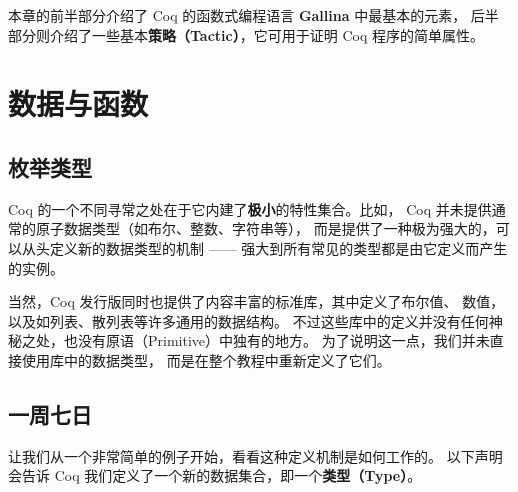 \documentclass[utf8]{ctexart}
\begin{document}
本章的前半部分介绍了 Coq 的函数式编程语言 \textbf{Gallina}
中最基本的元素，
后半部分则介绍了一些基本\textbf{策略（Tactic）}，它可用于证明 Coq
程序的简单属性。

\protect\hypertarget{lab19}{}{}

\hypertarget{ux6570ux636eux4e0eux51fdux6570}{%
\section{数据与函数}\label{ux6570ux636eux4e0eux51fdux6570}}

\protect\hypertarget{lab20}{}{}

\hypertarget{ux679aux4e3eux7c7bux578b}{%
\subsection{枚举类型}\label{ux679aux4e3eux7c7bux578b}}

Coq 的一个不同寻常之处在于它内建了\textbf{极小}的特性集合。比如， Coq
并未提供通常的原子数据类型（如布尔、整数、字符串等），
而是提供了一种极为强大的，可以从头定义新的数据类型的机制 ------
强大到所有常见的类型都是由它定义而产生的实例。

当然，Coq 发行版同时也提供了内容丰富的标准库，其中定义了布尔值、
数值，以及如列表、散列表等许多通用的数据结构。
不过这些库中的定义并没有任何神秘之处，也没有原语（Primitive）中独有的地方。
为了说明这一点，我们并未直接使用库中的数据类型，
而是在整个教程中重新定义了它们。

\protect\hypertarget{lab21}{}{}

\hypertarget{ux4e00ux5468ux4e03ux65e5}{%
\subsection{一周七日}\label{ux4e00ux5468ux4e03ux65e5}}

让我们从一个非常简单的例子开始，看看这种定义机制是如何工作的。
以下声明会告诉 Coq
我们定义了一个新的数据集合，即一个\textbf{类型（Type）}。
\end{document}
